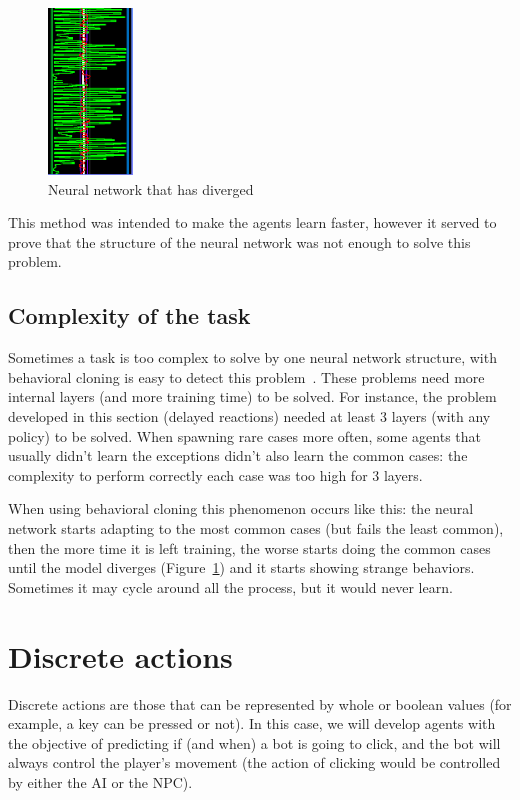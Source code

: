\begin{figure}
    \centering
    \includegraphics[width=0.2\textwidth]{img/complexity.png}
		\caption{Neural network that has diverged}
		\label{fig:complexity}
\end{figure}

This method was intended to make the agents learn faster, however it served to prove that the structure of the neural network was not enough to solve this problem.

\subsection{Complexity of the task} 
\label{sec:complex}

Sometimes a task is too complex to solve by one neural network structure, with behavioral cloning is easy to detect this problem~\cite{xor}. These problems need more internal layers (and more training time) to be solved. For instance, the problem developed in this section (delayed reactions) needed at least 3 layers (with any policy) to be solved. When spawning rare cases more often, some agents that usually didn't learn the exceptions didn't also learn the common cases: the complexity to perform correctly each case was too high for 3 layers.


When using behavioral cloning this phenomenon occurs like this: the neural network starts adapting to the most common cases (but fails the least common), then the more time it is left training, the worse starts doing the common cases until the model diverges (Figure~\ref{fig:complexity}) and it starts showing strange behaviors. Sometimes it may cycle around all the process, but it would never learn.

\section{Discrete actions}

Discrete actions are those that can be represented by whole or boolean values (for example, a key can be pressed or not). In this case, we will develop agents with the objective of predicting if (and when) a bot is going to click, and the bot will always control the player's movement (the action of clicking would be controlled by either the AI or the NPC).

